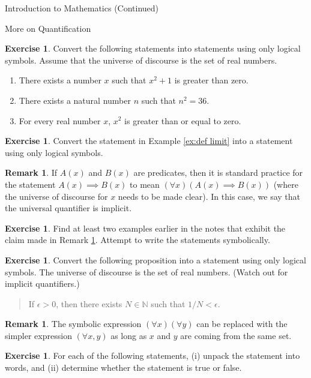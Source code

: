 \documentclass[11pt]{article}
\theoremstyle{definition}
\newtheorem{exercise}[theorem]{Exercise}
\newtheorem{remark}[theorem]{Remark}
\begin{document}
\begin{section}{Introduction to Mathematics (Continued)}
\begin{subsection}{More on Quantification}
\begin{exercise} Convert the following statements into statements using only logical symbols.  Assume that the universe of discourse is the set of real numbers.
\begin{enumerate}
\item There exists a number $x$ such that $x^2+1$ is greater than zero.
\item There exists a natural number $n$ such that $n^2=36$. 
\item For every real number $x$, $x^2$ is greater than or equal to zero.
\end{enumerate}
\end{exercise}

\begin{exercise}
Convert the statement in Example \ref{ex:def limit} into a statement using only logical symbols.
\end{exercise}

\begin{remark}\label{rem:implicit universal}
If $A(x)$ and $B(x)$ are predicates, then it is standard practice for the statement $A(x)\implies B(x)$ to mean $(\forall x)(A(x)\implies B(x))$ (where the universe of discourse for $x$ needs to be made clear).  In this case, we say that the universal quantifier is implicit.
\end{remark}

\begin{exercise}
Find at least two examples earlier in the notes that exhibit the claim made in Remark \ref{rem:implicit universal}.  Attempt to write the statements symbolically.
\end{exercise}

\begin{exercise}
Convert the following proposition into a statement using only logical symbols.  The universe of discourse is the set of real numbers.  (Watch out for implicit quantifiers.)
\begin{quote}
If $\epsilon >0$, then there exists $N\in\mathbb{N}$ such that $1/N<\epsilon$.
\end{quote}
\end{exercise}

\begin{remark}
The symbolic expression $(\forall x)(\forall y)$ can be replaced with the simpler expression $(\forall x,y)$ as long as $x$ and $y$ are coming from the same set.
\end{remark}

\begin{exercise}
For each of the following statements, (i) unpack the statement into words, and (ii) determine whether the statement is true or false.


\end{exercise}
\end{subsection}
\end{section}
\end{document}
